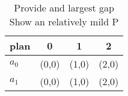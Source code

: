 \documentclass[a4paper]{article}
\begin{document}
\begin{table}
\begin{adjustbox}{width=0.6\columnwidth}
\begin{tabular}{|l|l|l|l|}
\hline
\textbf{plan} & \multicolumn{1}{c|}{\textbf{0}} & \multicolumn{1}{c|}{\textbf{1}} & \multicolumn{1}{c|}{\textbf{2}} \\ \hline
\textbf{$a_0$}  & (0,0) & (1,0) & (2,0) \\ \hline
\textbf{$a_1$}  & (0,0) & (1,0) & (2,0) \\ \hline
\end{tabular}
\end{adjustbox}
\caption{Provide and largest gap Show an relatively mild P
}
\end{table}
\end{document}
